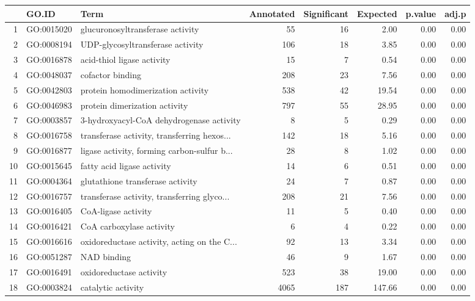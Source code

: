 \begin{table}[ht]
\centering
\begin{tabular}{rllrrrrr}
  \hline
 & GO.ID & Term & Annotated & Significant & Expected & p.value & adj.p \\ 
  \hline
1 & GO:0015020 & glucuronosyltransferase activity &  55 &  16 & 2.00 & 0.00 & 0.00 \\ 
  2 & GO:0008194 & UDP-glycosyltransferase activity & 106 &  18 & 3.85 & 0.00 & 0.00 \\ 
  3 & GO:0016878 & acid-thiol ligase activity &  15 &   7 & 0.54 & 0.00 & 0.00 \\ 
  4 & GO:0048037 & cofactor binding & 208 &  23 & 7.56 & 0.00 & 0.00 \\ 
  5 & GO:0042803 & protein homodimerization activity & 538 &  42 & 19.54 & 0.00 & 0.00 \\ 
  6 & GO:0046983 & protein dimerization activity & 797 &  55 & 28.95 & 0.00 & 0.00 \\ 
  7 & GO:0003857 & 3-hydroxyacyl-CoA dehydrogenase activity &   8 &   5 & 0.29 & 0.00 & 0.00 \\ 
  8 & GO:0016758 & transferase activity, transferring hexos... & 142 &  18 & 5.16 & 0.00 & 0.00 \\ 
  9 & GO:0016877 & ligase activity, forming carbon-sulfur b... &  28 &   8 & 1.02 & 0.00 & 0.00 \\ 
  10 & GO:0015645 & fatty acid ligase activity &  14 &   6 & 0.51 & 0.00 & 0.00 \\ 
  11 & GO:0004364 & glutathione transferase activity &  24 &   7 & 0.87 & 0.00 & 0.00 \\ 
  12 & GO:0016757 & transferase activity, transferring glyco... & 208 &  21 & 7.56 & 0.00 & 0.00 \\ 
  13 & GO:0016405 & CoA-ligase activity &  11 &   5 & 0.40 & 0.00 & 0.00 \\ 
  14 & GO:0016421 & CoA carboxylase activity &   6 &   4 & 0.22 & 0.00 & 0.00 \\ 
  15 & GO:0016616 & oxidoreductase activity, acting on the C... &  92 &  13 & 3.34 & 0.00 & 0.00 \\ 
  16 & GO:0051287 & NAD binding &  46 &   9 & 1.67 & 0.00 & 0.00 \\ 
  17 & GO:0016491 & oxidoreductase activity & 523 &  38 & 19.00 & 0.00 & 0.00 \\ 
  18 & GO:0003824 & catalytic activity & 4065 & 187 & 147.66 & 0.00 & 0.00 \\ 

\end{tabular}
\end{table}
